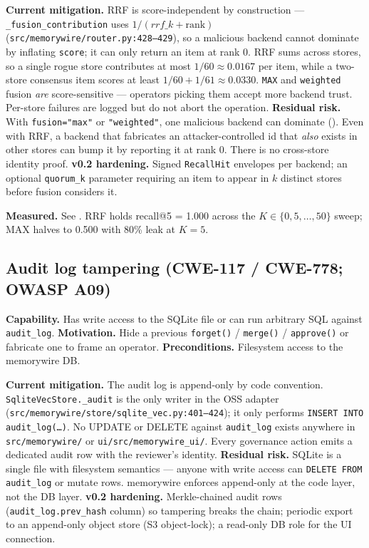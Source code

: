 \documentclass[11pt,letterpaper,twocolumn]{article}
\begin{document}
\textbf{Current mitigation.} RRF is score-independent by construction --- \texttt{\_fusion\_contribution} uses $1 / (\mathit{rrf\_k} + \mathrm{rank})$ (\texttt{src/memorywire/router.py:428--429}), so a malicious backend cannot dominate by inflating \texttt{score}; it can only return an item at rank 0. RRF sums across stores, so a single rogue store contributes at most $1/60 \approx 0.0167$ per item, while a two-store consensus item scores at least $1/60 + 1/61 \approx 0.0330$. \texttt{MAX} and \texttt{weighted} fusion \emph{are} score-sensitive --- operators picking them accept more backend trust. Per-store failures are logged but do not abort the operation. \textbf{Residual risk.} With \texttt{fusion="max"} or \texttt{"weighted"}, one malicious backend can dominate (). Even with RRF, a backend that fabricates an attacker-controlled id that \emph{also} exists in other stores can bump it by reporting it at rank 0. There is no cross-store identity proof. \textbf{v0.2 hardening.} Signed \texttt{RecallHit} envelopes per backend; an optional \texttt{quorum\_k} parameter requiring an item to appear in $k$ distinct stores before fusion considers it.

\textbf{Measured.} See . RRF holds recall@5 = 1.000 across the $K \in \{0,5,\dots,50\}$ sweep; MAX halves to 0.500 with 80\% leak at $K=5$.

\subsection{Audit log tampering (CWE-117 / CWE-778; OWASP A09)}
\label{sec:threats-audit}

\textbf{Capability.} Has write access to the SQLite file or can run arbitrary SQL against \texttt{audit\_log}. \textbf{Motivation.} Hide a previous \texttt{forget()} / \texttt{merge()} / \texttt{approve()} or fabricate one to frame an operator. \textbf{Preconditions.} Filesystem access to the memorywire DB.

\textbf{Current mitigation.} The audit log is append-only by code convention. \texttt{SqliteVecStore.\_audit} is the only writer in the OSS adapter (\texttt{src/memorywire/store/sqlite\_vec.py:401--424}); it only performs \texttt{INSERT INTO audit\_log(\ldots)}. No UPDATE or DELETE against \texttt{audit\_log} exists anywhere in \texttt{src/memorywire/} or \texttt{ui/src/memorywire\_ui/}. Every governance action emits a dedicated audit row with the reviewer's identity. \textbf{Residual risk.} SQLite is a single file with filesystem semantics --- anyone with write access can \texttt{DELETE FROM audit\_log} or mutate rows. memorywire enforces append-only at the code layer, not the DB layer. \textbf{v0.2 hardening.} Merkle-chained audit rows (\texttt{audit\_log.prev\_hash} column) so tampering breaks the chain; periodic export to an append-only object store (S3 object-lock); a read-only DB role for the UI connection.
\end{document}
